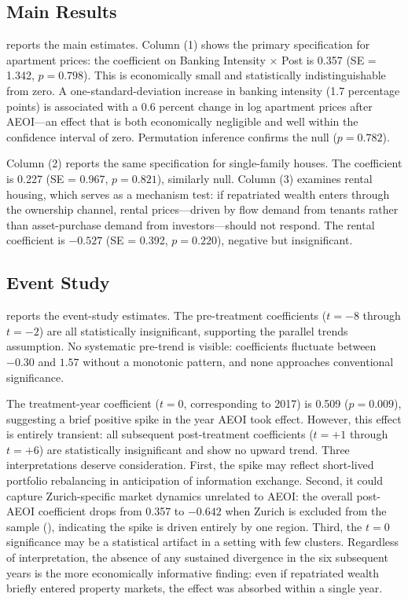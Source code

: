 \documentclass[12pt]{article}
\begin{document}
\subsection{Main Results}

 reports the main estimates. Column (1) shows the primary specification for apartment prices: the coefficient on Banking Intensity $\times$ Post is 0.357 (SE = 1.342, $p = 0.798$). This is economically small and statistically indistinguishable from zero. A one-standard-deviation increase in banking intensity (1.7 percentage points) is associated with a 0.6 percent change in log apartment prices after AEOI---an effect that is both economically negligible and well within the confidence interval of zero. Permutation inference confirms the null ($p = 0.782$).

Column (2) reports the same specification for single-family houses. The coefficient is 0.227 (SE = 0.967, $p = 0.821$), similarly null. Column (3) examines rental housing, which serves as a mechanism test: if repatriated wealth enters through the ownership channel, rental prices---driven by flow demand from tenants rather than asset-purchase demand from investors---should not respond. The rental coefficient is $-0.527$ (SE = 0.392, $p = 0.220$), negative but insignificant.



\subsection{Event Study}

 reports the event-study estimates. The pre-treatment coefficients ($t = -8$ through $t = -2$) are all statistically insignificant, supporting the parallel trends assumption. No systematic pre-trend is visible: coefficients fluctuate between $-0.30$ and $1.57$ without a monotonic pattern, and none approaches conventional significance.

The treatment-year coefficient ($t = 0$, corresponding to 2017) is 0.509 ($p = 0.009$), suggesting a brief positive spike in the year AEOI took effect. However, this effect is entirely transient: all subsequent post-treatment coefficients ($t = +1$ through $t = +6$) are statistically insignificant and show no upward trend. Three interpretations deserve consideration. First, the spike may reflect short-lived portfolio rebalancing in anticipation of information exchange. Second, it could capture Zurich-specific market dynamics unrelated to AEOI: the overall post-AEOI coefficient drops from 0.357 to $-0.642$ when Zurich is excluded from the sample (), indicating the spike is driven entirely by one region. Third, the $t=0$ significance may be a statistical artifact in a setting with few clusters. Regardless of interpretation, the absence of any sustained divergence in the six subsequent years is the more economically informative finding: even if repatriated wealth briefly entered property markets, the effect was absorbed within a single year.
\end{document}

